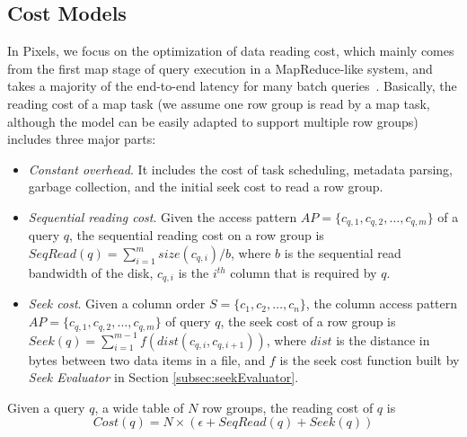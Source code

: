 
\subsection{Cost Models}

In Pixels, we focus on the optimization of data reading cost, which mainly comes from the first map stage of query execution in a MapReduce-like system, and takes a majority of the end-to-end latency for many batch queries~\cite{ColumnOrdering}. Basically, the reading cost of a map task (we assume one row group is read by a map task, although the model can be easily adapted to support multiple row groups) includes three major parts:
\begin{itemize}
	\item \textit{Constant overhead}. It includes the cost of task scheduling, metadata parsing, garbage collection, and the initial seek cost to read a row group.
	
	\item \textit{Sequential reading cost}. Given the access pattern $AP=\{c_{q,1},c_{q,2},\dots,c_{q,m}\}$ of a query $q$, the sequential reading cost on a row group is $SeqRead(q)=\sum_{i=1}^{m}size(c_{q,i})/b$, where $b$ is the sequential read bandwidth of the disk, $c_{q,i}$ is the $i^{th}$ column that is required by $q$.
	
	\item \textit{Seek cost}. Given a column order $S=\{c_1, c_2,\dots,c_n\}$, the column access pattern $AP=\{c_{q,1},c_{q,2},\dots,c_{q,m}\}$ of query $q$, the seek cost of a row group is \\$Seek(q)=\sum_{i=1}^{m-1}f(dist(c_{q,i},c_{q,i+1}))$, where $dist$ is the distance in bytes between two data items in a file, and $f$ is the seek cost function built by \textit{Seek Evaluator} in Section \ref{subsec:seekEvaluator}.
\end{itemize}

\begin{Definition}\label{equ:qcost}
	Given a query $q$, a wide table of $N$ row groups, the reading cost of $q$ is
	\begin{equation}
	Cost(q) = N\times(\epsilon+SeqRead(q)+Seek(q))
	\label{equ:querycost}
	\end{equation}
\end{Definition}

